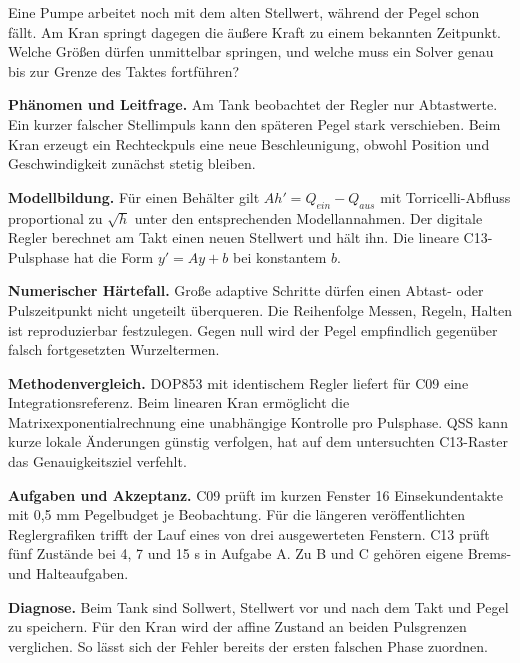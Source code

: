 Eine Pumpe arbeitet noch mit dem alten Stellwert, während der Pegel schon fällt. Am Kran springt dagegen die äußere Kraft zu einem bekannten Zeitpunkt. Welche Größen dürfen unmittelbar springen, und welche muss ein Solver genau bis zur Grenze des Taktes fortführen?
\par\textsf{\bfseries\color{sea}Phänomen und Leitfrage.} Am Tank beobachtet der Regler nur Abtastwerte. Ein kurzer falscher Stellimpuls kann den späteren Pegel stark verschieben. Beim Kran erzeugt ein Rechteckpuls eine neue Beschleunigung, obwohl Position und Geschwindigkeit zunächst stetig bleiben.
\par\textsf{\bfseries\color{sea}Modellbildung.} Für einen Behälter gilt \(A h'=Q_{ein}-Q_{aus}\) mit Torricelli-Abfluss proportional zu \(\sqrt{h}\) unter den entsprechenden Modellannahmen. Der digitale Regler berechnet am Takt einen neuen Stellwert und hält ihn. Die lineare C13-Pulsphase hat die Form \(y'=Ay+b\) bei konstantem \(b\).
\par\textsf{\bfseries\color{sea}Numerischer Härtefall.} Große adaptive Schritte dürfen einen Abtast- oder Pulszeitpunkt nicht ungeteilt überqueren. Die Reihenfolge Messen, Regeln, Halten ist reproduzierbar festzulegen. Gegen null wird der Pegel empfindlich gegenüber falsch fortgesetzten Wurzeltermen.
\par\textsf{\bfseries\color{sea}Methodenvergleich.} DOP853 mit identischem Regler liefert für C09 eine Integrationsreferenz. Beim linearen Kran ermöglicht die Matrixexponentialrechnung eine unabhängige Kontrolle pro Pulsphase. QSS kann kurze lokale Änderungen günstig verfolgen, hat auf dem untersuchten C13-Raster das Genauigkeitsziel verfehlt.
\par\textsf{\bfseries\color{sea}Aufgaben und Akzeptanz.} C09 prüft im kurzen Fenster 16 Einsekundentakte mit 0,5 mm Pegelbudget je Beobachtung. Für die längeren veröffentlichten Reglergrafiken trifft der Lauf eines von drei ausgewerteten Fenstern. C13 prüft fünf Zustände bei 4, 7 und 15 s in Aufgabe A. Zu B und C gehören eigene Brems- und Halteaufgaben.
\par\textsf{\bfseries\color{sea}Diagnose.} Beim Tank sind Sollwert, Stellwert vor und nach dem Takt und Pegel zu speichern. Für den Kran wird der affine Zustand an beiden Pulsgrenzen verglichen. So lässt sich der Fehler bereits der ersten falschen Phase zuordnen.

